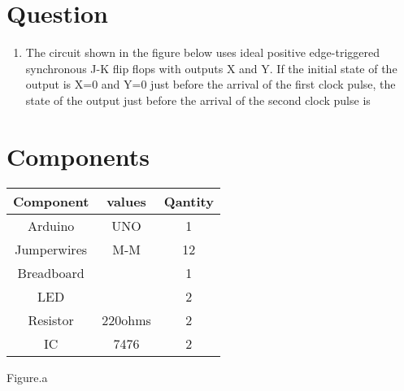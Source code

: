 \documentclass[journal,12pt]{article}
\title{\mytitle}
\author{\myauthor\hspace{1em}\\\contact\\IITH\hspace{0.5em}-\hspace{0.6em}\mymodule}
\date{27-03-2023}
\begin{document}
\theoremstyle{definition}
\newtheorem{theorem}{Theorem}[section]
\newtheorem{problem}{Problem}
\newtheorem{proposition}{Proposition}[section]
\newtheorem{lemma}{Lemma}[section]
\newtheorem{corollary}[theorem]{Corollary}
\newtheorem{example}{Example}[section]
\newtheorem{definition}{Definition}[section]
\newcommand{\BEQA}{\begin{eqnarray}}
\newcommand{\EEQA}{\end{eqnarray}}
\newcommand{\define}{\stackrel{\triangle}{=}}

\vspace{3cm}
\maketitle
\tableofcontents
\pagebreak
\section{Question}
\begin{enumerate}
    \item The circuit shown in the figure below uses ideal positive edge-triggered synchronous J-K flip flops with outputs X and Y. If the initial state of the output is X=0 and Y=0 just before the arrival of the first clock pulse, the state of the output just before the arrival of the second clock pulse is
\end{enumerate}
\begin{figure}[h]
        \centering
	
	\caption{}
\end{figure}
\section{Components}
\begin{table}[h]
\centering
\begin{tabular}{|c|c|c|}
\hline
  \textbf{Component}& \textbf{values} & \textbf{Qantity}\\
\hline
  Arduino & UNO & 1 \\
\hline
  Jumperwires & M-M & 12 \\
\hline
  Breadboard & & 1 \\
\hline
  LED & & 2\\
\hline
  Resistor & 220ohms & 2 \\
\hline
  IC & 7476 & 2 \\
\hline
\end{tabular}
\end{table}
\begin{center}
Figure.a
\end{center}
\end{document}
